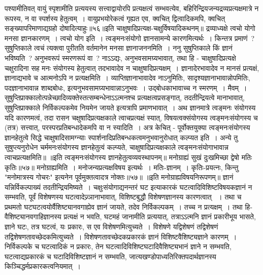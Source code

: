 पश्यामीतिवत् वायुं स्पृशामीति प्रत्ययस्य सत्त्वाद्वायोरपि प्रत्यक्षत्वं सम्भवत्येव, बहिरिन्द्रियजन्यद्रव्यप्रत्यक्षमात्रे न रूपस्य, न वा स्पर्शस्य हेतुत्वम्~। वायुप्रभयोरेकत्वं गृह्यत
एव, क्वचित् द्वित्वादिकमपि, क्वचित् सङ्ख्यापरिमाणाद्यग्रहो दोषादित्याहुः॥५६॥इति चाक्षुषादिप्रत्यक्ष-चक्षुर्विषयादिकथनम्॥
द्रव्याध्यक्षे त्वचो योगो मनसा ज्ञानकारणम्~।
त्वचो योग इति~। त्वङ्मनःसंयोगो ज्ञानसामन्ये कारणमित्यर्थः~। किन्तत्र प्रमाणं~? सुषुप्तिकाले त्वचं त्यक्त्वा पुरीतति वर्तमानेन मनसा ज्ञानाजननमिति~। ननु
सुषुप्तिकाले किं ज्ञानं भविष्यति~? अनुभवरूपं स्मरणरूपं वा~? नाऽऽद्यः, अनुभवसामग्र्यभावात्, तथा हि - चाक्षुषादिप्रत्यक्षे चक्षुरादिना सह मनः संयोगस्य हेतुत्वात्
तदभावादेव न चाक्षुषादिप्रत्यक्षम्~। ज्ञानादेरभावादेव न मानसं प्रत्यक्षं, ज्ञानाद्यभावे च आत्मनोऽपि न प्रत्यक्षमिति~। व्याप्तिज्ञानाभावादेव नाऽनुमितिः, सादृश्यज्ञानाभावान्नोपमितिः,
पदज्ञानाभावान्न शाब्दबोधः, इत्यनुभवसामग्र्यभावान्नाऽनुभवः~। उद्बोधकाभावाच्च न स्मरणम्~। मैवम्~। सुषुप्तिप्राक्कालोत्पन्नेच्छादिव्यक्तेस्तत्सम्बन्धेनाऽऽत्मनश्च प्रत्यक्षत्वप्रसङ्गात्,
तदतीन्द्रियत्वे मानाभावात्, सुषुप्तिप्राक्काले निर्विकल्पकमेव नियमेन जायते इत्यत्रापि प्रमाणभावात्~। अथ ज्ञानमात्रे त्वङ्मनः संयोगस्य यदि कारणमत्वं, तदा रासन
चक्षुषादिप्रत्यक्षकाले त्वाचप्रत्यक्षं स्यात्, विषयत्वक्संयोगस्य त्वङ्मनःसंयोगस्य च (तत्र) सत्त्वात्, परस्परप्रतिबन्धादेकमपि वा न स्यादिति~। अत्र केचित् - पूर्वोक्तयुक्या
त्वङ्मनःसंयोगस्य ज्ञानहेतुत्वे सिद्धे चाक्षुषादिसामग्न्याः स्पार्शनादिप्रतिबन्धकत्वमनुभवानुरोधात् कल्प्यत इति~। अन्ये तु सुषुप्त्यनुरोधेन चर्ममनःसंयोगस्य ज्ञानहेतुत्वं
कल्प्यते, चाक्षुषादिप्रत्यक्षकाले त्वङ्मनःसंयोगाभावान्न त्वाचप्रत्यक्षमिति॥
॥इति त्वङ्मनःसंयोगस्य ज्ञानहेतुत्वव्यवस्थापनम्॥
मनोग्राह्यं सुखं दुःखमिच्छा द्वेषो मतिः कृतिः॥५७॥
मनोग्राह्यमिति~। मनोजन्यप्रत्यक्षविषय इत्यर्थः~। मतिः-ज्ञानम्~। कृतिः-प्रयत्नः, किन्तु "मनोमात्रस्य गोचरः" इत्यनेन पूर्वमुक्तत्वादत्र नोक्तः॥५७॥
॥इति मनोग्राह्यविषयनिरूपणम्॥
ज्ञानं यन्निर्विकल्पाख्यं तदतीन्द्रियमिष्यते~।
चक्षुःसंयोगाद्यनन्तरं घट इत्याकारकं घटत्वादिविशिष्टविषयकज्ञानं न सम्भवति, पूर्वं विशेषणस्य घटत्वादेज्र्ञानाभावात्, विशिष्टबुद्धौ विशेषणज्ञानस्य कारणत्वात्
~। तथा च प्रथमतो घटघटत्वयोर्वैशिष्ट्यानवगाह्येव ज्ञानं जायते, तदेव निर्विकल्पकम्~। तच्च न प्रत्यक्षम्~। तथा हि-वैशिष्ट्यानवगाहिज्ञानस्य प्रत्यक्षं न भवति, घटमहं
जानामीति प्रत्ययात्, तत्राऽऽत्मनि ज्ञानं प्रकारीभूय भासते, ज्ञाने घटः, तत्र घटत्वं, यः प्रकारः, स एव
विशेषणमित्युच्यते~। विशेषणे यद्विशेषणं तद्विशेषणं तद्विशेषणतावच्छेदकमित्युच्यते~।
विशेषणतावच्छेदकप्रकारकं ज्ञानं विशिष्टवैशिष्ट्यज्ञाने कारणम्~। निर्विकल्पके च घटत्वादिकं न प्रकारः, तेन घटत्वादिविशिष्टघटादिवैशिष्ट्यभानं ज्ञाने न
सम्भवति, घटत्वाद्यप्रकारकं च घटादिविशिष्टज्ञानं न सम्भवति, जात्यखण्डोपाध्यतिरिक्तपदार्थज्ञानस्य किञ्चिद्धर्मप्रकारकत्वनियमात्~।
